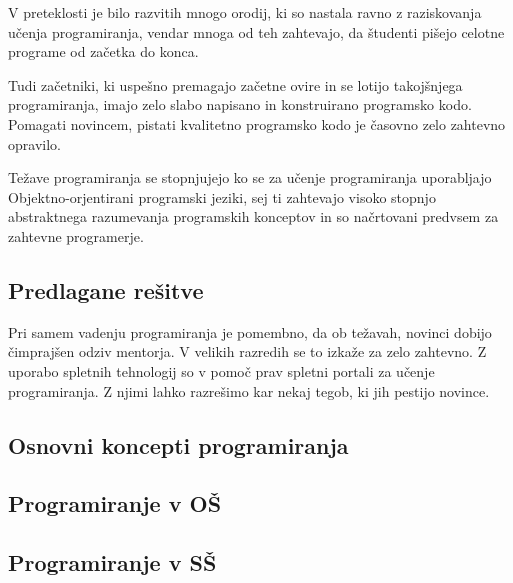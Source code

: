 V preteklosti je bilo razvitih mnogo orodij, ki so nastala ravno z
raziskovanja učenja programiranja, vendar mnoga od teh zahtevajo, da
študenti pišejo celotne programe od začetka do konca.

Tudi začetniki, ki uspešno premagajo začetne ovire in se lotijo
takojšnjega programiranja, imajo zelo slabo napisano in konstruirano
programsko kodo. Pomagati novincem, pistati kvalitetno programsko kodo
je časovno zelo zahtevno opravilo.

Težave programiranja se stopnjujejo ko se za učenje programiranja
uporabljajo Objektno-orjentirani programski jeziki, sej ti zahtevajo
visoko stopnjo abstraktnega razumevanja programskih konceptov in so
načrtovani predvsem za zahtevne programerje.


\subsection{Predlagane rešitve}
\label{sec:predlagane_resitve}

Pri samem vadenju programiranja je pomembno, da ob težavah, novinci
dobijo čimprajšen odziv mentorja. V velikih razredih se to izkaže za
zelo zahtevno. Z uporabo spletnih tehnologij so v pomoč prav spletni
portali za učenje programiranja. Z njimi lahko razrešimo kar nekaj
tegob, ki jih pestijo novince.


\subsection{Osnovni koncepti programiranja}
\label{sec:Osnvni koncepti_programiranja}


\subsection{Programiranje v OŠ}
\label{sec:Programiranje_v_OŠ}

\subsection{Programiranje v SŠ}
\label{sec:Programiranje_v_SŠ}


